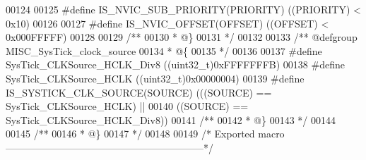 \begin{DoxyCode}
00124 
00125 \textcolor{preprocessor}{#}\textcolor{preprocessor}{define} \textcolor{preprocessor}{IS\_NVIC\_SUB\_PRIORITY}\textcolor{preprocessor}{(}\textcolor{preprocessor}{PRIORITY}\textcolor{preprocessor}{)}  \textcolor{preprocessor}{(}\textcolor{preprocessor}{(}\textcolor{preprocessor}{PRIORITY}\textcolor{preprocessor}{)} \textcolor{preprocessor}{<} 0x10\textcolor{preprocessor}{)}
00126 
00127 \textcolor{preprocessor}{#}\textcolor{preprocessor}{define} \textcolor{preprocessor}{IS\_NVIC\_OFFSET}\textcolor{preprocessor}{(}\textcolor{preprocessor}{OFFSET}\textcolor{preprocessor}{)}  \textcolor{preprocessor}{(}\textcolor{preprocessor}{(}\textcolor{preprocessor}{OFFSET}\textcolor{preprocessor}{)} \textcolor{preprocessor}{<} 0x000FFFFF\textcolor{preprocessor}{)}
00128 
00129 \textcolor{comment}{/**}
00130 \textcolor{comment}{  * @\}}
00131 \textcolor{comment}{  */}
00132 
00133 \textcolor{comment}{/** @defgroup MISC\_SysTick\_clock\_source }
00134 \textcolor{comment}{  * @\{}
00135 \textcolor{comment}{  */}
00136 
00137 \textcolor{preprocessor}{#}\textcolor{preprocessor}{define} \textcolor{preprocessor}{SysTick\_CLKSource\_HCLK\_Div8}    \textcolor{preprocessor}{(}\textcolor{preprocessor}{(}\textcolor{preprocessor}{uint32\_t}\textcolor{preprocessor}{)}0xFFFFFFFB\textcolor{preprocessor}{)}
00138 \textcolor{preprocessor}{#}\textcolor{preprocessor}{define} \textcolor{preprocessor}{SysTick\_CLKSource\_HCLK}         \textcolor{preprocessor}{(}\textcolor{preprocessor}{(}\textcolor{preprocessor}{uint32\_t}\textcolor{preprocessor}{)}0x00000004\textcolor{preprocessor}{)}
00139 \textcolor{preprocessor}{#}\textcolor{preprocessor}{define} \textcolor{preprocessor}{IS\_SYSTICK\_CLK\_SOURCE}\textcolor{preprocessor}{(}\textcolor{preprocessor}{SOURCE}\textcolor{preprocessor}{)} \textcolor{preprocessor}{(}\textcolor{preprocessor}{(}\textcolor{preprocessor}{(}\textcolor{preprocessor}{SOURCE}\textcolor{preprocessor}{)} \textcolor{preprocessor}{==} SysTick_CLKSource_HCLK\textcolor{preprocessor}{)} \textcolor{preprocessor}{||}
00140                                        \textcolor{preprocessor}{(}\textcolor{preprocessor}{(}\textcolor{preprocessor}{SOURCE}\textcolor{preprocessor}{)} \textcolor{preprocessor}{==} 
      SysTick_CLKSource_HCLK_Div8\textcolor{preprocessor}{)}\textcolor{preprocessor}{)}
00141 \textcolor{comment}{/**}
00142 \textcolor{comment}{  * @\}}
00143 \textcolor{comment}{  */}
00144 
00145 \textcolor{comment}{/**}
00146 \textcolor{comment}{  * @\}}
00147 \textcolor{comment}{  */}
00148 
00149 \textcolor{comment}{/* Exported macro ------------------------------------------------------------*/}

\end{DoxyCode}
